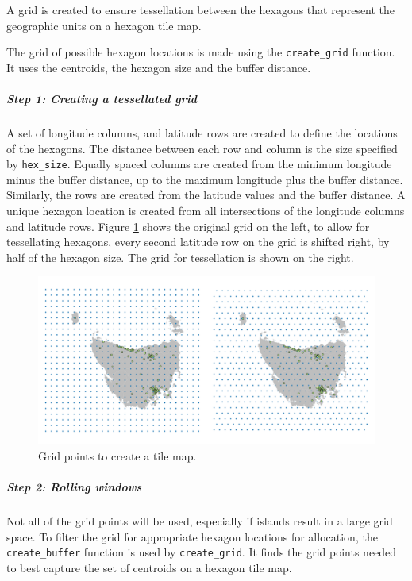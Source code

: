 \documentclass{monashthesis}
\begin{document}
A grid is created to ensure tessellation between the hexagons that represent the geographic units on a hexagon tile map.

The grid of possible hexagon locations is made using the \texttt{create\_grid} function.
It uses the centroids, the hexagon size and the buffer distance.

\hypertarget{step-1-creating-a-tessellated-grid}{%
\subparagraph{Step 1: Creating a tessellated grid}\label{step-1-creating-a-tessellated-grid}}

A set of longitude columns, and latitude rows are created to define the locations of the hexagons. The distance between each row and column is the size specified by \texttt{hex\_size}.
Equally spaced columns are created from the minimum longitude minus the buffer distance, up to the maximum longitude plus the buffer distance. Similarly, the rows are created from the latitude values and the buffer distance.
A unique hexagon location is created from all intersections of the longitude columns and latitude rows.
Figure \ref{fig:grid2} shows the original grid on the left, to allow for tessellating hexagons, every second latitude row on the grid is shifted right, by half of the hexagon size. The grid for tessellation is shown on the right.

\begin{figure}[H]
\centering
\includegraphics[width=14cm]{figures/03-algorithm/2grid.png}
\caption{\label{fig:grid2}Grid points to create a tile map.}
\end{figure}

\hypertarget{step-2-rolling-windows}{%
\subparagraph{Step 2: Rolling windows}\label{step-2-rolling-windows}}

Not all of the grid points will be used, especially if islands result in a large grid space.
To filter the grid for appropriate hexagon locations for allocation, the \texttt{create\_buffer} function is used by \texttt{create\_grid}.
It finds the grid points needed to best capture the set of centroids on a hexagon tile map.
\end{document}
